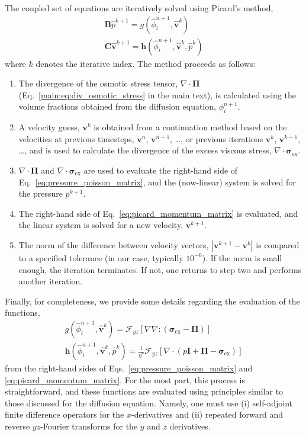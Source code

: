 \documentclass[journal=mamobx,manuscript=suppinfo]{achemso}
\newcommand{\ex}{\mathrm{ex}}
\begin{document}
The coupled set of equations are iteratively solved using Picard's method,
\begin{gather} 
\bm{B} \hat{p}^{k+1} = g(\hat{\phi}_{i}^{n+1}, \hat{\bm{v}}^{k}) \label{eq:pressure_poisson_matrix} \\
\bm{C} \hat{\bm{v}}^{k+1} = \bm{h}(\hat{\phi}_{i}^{n+1}, \hat{\bm{v}}^{k}, \hat{p}^{k}) \label{eq:picard_momentum_matrix}
\end{gather}
where $k$ denotes the iterative index.
The method proceeds as follows:
\begin{enumerate}
  \item The divergence of the osmotic stress tensor, $\nabla \cdot \bm{\Pi}$ (Eq.~\ref{main:eq:div_osmotic_stress} in the main text), is calculated using the volume fractions obtained from the diffusion equation, $\phi_{i}^{n+1}$.
  \item A velocity guess, $\bm{v}^{k}$ is obtained from a continuation method based on the velocities at previous timesteps, $\bm{v}^{n}$, $\bm{v}^{n-1}$, \ldots, or previous iterations $\bm{v}^{k}$, $\bm{v}^{k-1}$, \ldots, and is used to calculate the divergence of the excess viscous stress, $\nabla \cdot \bm{\sigma}_{\ex}$.
  \item $\nabla \cdot \bm{\Pi}$ and $\nabla \cdot \bm{\sigma}_{\ex}$ are used to evaluate the right-hand side of Eq.~\ref{eq:pressure_poisson_matrix}, and the (now-linear) system is solved for the pressure $p^{k+1}$.
  \item The right-hand side of Eq.~\ref{eq:picard_momentum_matrix} is evaluated, and the linear system is solved for a new velocity, $\bm{v}^{k+1}$.
  \item The norm of the difference between velocity vectors, $| \bm{v}^{k+1} - \bm{v}^{k} |$ is compared to a specified tolerance (in our case, typically $10^{-6}$).
If the norm is small enough, the iteration terminates.
If not, one returns to step two\footnotemark{} and performs another iteration. %
\end{enumerate}

Finally, for completeness, we provide some details regarding the evaluation of the functions,
\begin{gather}
g(\hat{\phi}_{i}^{n+1}, \hat{\bm{v}}^{k}) = \mathcal{F}_{yz} \left [ \nabla \nabla : \left ( \bm{\sigma}_{\ex} - \bm{\Pi} \right ) \right ] \label{eq:poisson_rhs} \\
\bm{h}(\hat{\phi}_{i}^{n+1}, \hat{\bm{v}}^{k}, \hat{p}^{k}) = \frac{1}{\eta^{*}} \mathcal{F}_{yz} \left [ \nabla \cdot \left ( p\bm{I} + \bm{\Pi} - \bm{\sigma}_{\ex} \right ) \right ] \label{eq:momentum_rhs}
\end{gather}
from the right-hand sides of Eqs.~\ref{eq:pressure_poisson_matrix} and \ref{eq:picard_momentum_matrix}.
For the most part, this process is straightforward, and these functions are evaluated using principles similar to those discussed for the diffusion equation. 
Namely, one must use (i) self-adjoint finite difference operators for the $x$-derivatives and (ii) repeated forward and reverse $yz$-Fourier transforms for the $y$ and $z$ derivatives.
\end{document}

